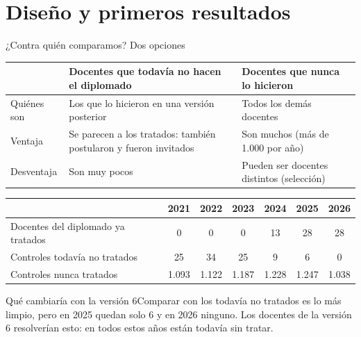 \documentclass[10pt,aspectratio=169]{beamer}
\newcommand{\sintesis}[2]{%
  \begin{block}{#1}#2\end{block}}
\begin{document}
\section{Diseño y primeros resultados}

\begin{frame}{¿Contra quién comparamos? Dos opciones}
  \begin{table}\small
    \begin{tabular}{p{3.2cm}p{5.1cm}p{5.1cm}}
      \toprule
      & \textbf{Docentes que todavía no hacen el diplomado} & \textbf{Docentes que nunca lo hicieron} \\
      \midrule
      Quiénes son & Los que lo hicieron en una versión posterior & Todos los demás docentes \\
      Ventaja & Se parecen a los tratados: también postularon y fueron invitados & Son muchos (más de 1.000 por año) \\
      Desventaja & Son muy pocos & Pueden ser docentes distintos (selección) \\
      \bottomrule
    \end{tabular}
  \end{table}
  \vspace{0.3em}
  \begin{table}\small
    \begin{tabular}{lcccccc}
      \toprule
      & 2021 & 2022 & 2023 & 2024 & 2025 & 2026 \\
      \midrule
      Docentes del diplomado ya tratados & 0 & 0 & 0 & 13 & 28 & 28 \\
      Controles todavía no tratados & 25 & 34 & 25 & 9 & 6 & \alert{0} \\
      Controles nunca tratados & 1.093 & 1.122 & 1.187 & 1.228 & 1.247 & 1.038 \\
      \bottomrule
    \end{tabular}
  \end{table}
  \sintesis{Qué cambiaría con la versión 6}{Comparar con los todavía no tratados es lo más limpio, pero en 2025 quedan solo 6 y en 2026 ninguno. Los docentes de la versión 6 resolverían esto: en todos estos años están todavía sin tratar.}
\end{frame}
\end{document}
